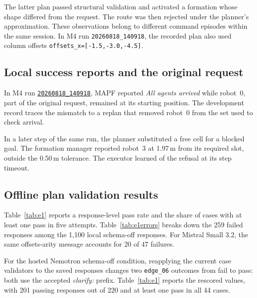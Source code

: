 \documentclass[pdflatex,sn-mathphys-num]{sn-jnl}
\newcommand{\code}[1]{{\def\{{\textnormal{\textbraceleft}}\def\}{\textnormal{\textbraceright}}\texttt{#1}}}
\begin{document}
The latter plan passed structural validation and activated a formation whose
shape differed from the request. The route was then rejected under the
planner's approximation. These observations belong to different command
episodes within the same session. In M4 run \code{20260818\_140918}, the
recorded plan also used column offsets \code{offsets\_x=[-1.5,-3.0,-4.5]}.

\subsection{Local success reports and the original request}
\label{sec:failures}

In M4 run
\href{https://github.com/Innopolis-Robotics-Society/llm_swarm}{\code{20260818\_140918}},
MAPF reported \emph{All agents arrived}
while robot~0, part of the original request, remained at its starting
position. The development record traces the mismatch to a replan that
removed robot~0 from the set used to check arrival.

In a later step of the same run, the planner substituted a free cell for
a blocked goal. The formation manager reported robot~3 at 1.97\,m from
its required slot, outside the 0.50\,m tolerance. The executor learned
of the refusal at its step timeout.

\subsection{Offline plan validation results}
\label{sec:planacc}

Table~\ref{tab:e1} reports a response-level pass rate and the share of
cases with at least one pass in five attempts. Table~\ref{tab:e1errors}
breaks down the 259 failed responses among the 1{,}100 local schema-off
responses. For Mistral Small 3.2, the same offsets-arity message accounts
for 20 of 47 failures.

For the hosted Nemotron schema-off condition, reapplying the current case
validators to the saved responses changes two \code{edge\_06} outcomes from fail
to pass: both use the accepted \emph{clarify:} prefix. Table~\ref{tab:e1}
reports the rescored values, with 201 passing responses out of 220 and at least
one pass in all 44 cases.
\end{document}
